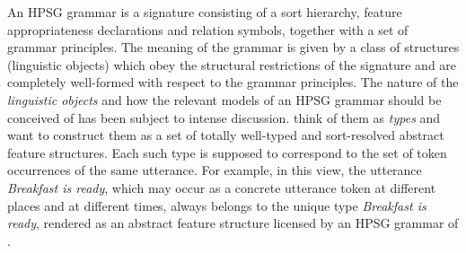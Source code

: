 \documentclass[output=paper
 	        ,biblatex
                ,babelshorthands
                ,newtxmath
                ,draftmode
                ,colorlinks, citecolor=brown
]{langscibook}
\begin{document}
{An HPSG grammar is a signature\label{formal:page-signature} consisting of a sort hierarchy, feature
appropriateness declarations and relation symbols, together with a set
of grammar principles. The meaning of the grammar is given by a class
of structures (linguistic objects) which obey the structural
restrictions of the signature and are completely well-formed with
respect to the grammar principles. The nature of the \emph{linguistic
  objects} and how the relevant models of an HPSG grammar should be
conceived of has been subject to intense
discussion. \citet[8--9]{PollardSag1994} think of them as \emph{types} and
want to construct them as a set of totally well-typed and
sort-resolved abstract feature structures. Each such type is supposed
to correspond to the set of token occurrences of the same utterance. For
example, in this view, the  utterance \emph{Breakfast is ready},
which may occur as a concrete utterance token
at different places and at different times, always belongs to the
unique type \emph{Breakfast is ready}, rendered as an abstract feature
structure licensed by an HPSG grammar of .

}
\end{document}

